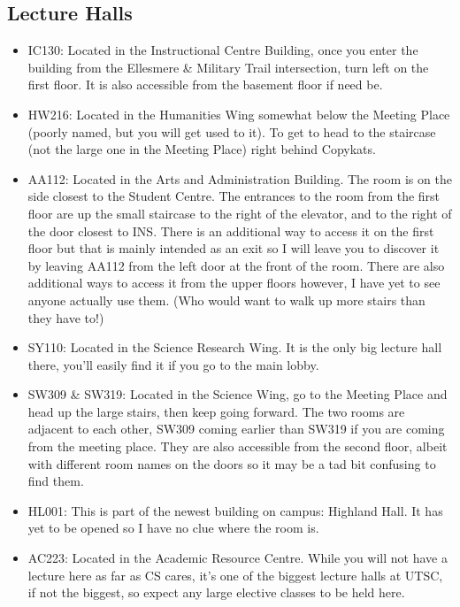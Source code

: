 \documentclass[11pt]{article}
\begin{document}
\subsection{Lecture Halls}
\begin{itemize}
\item IC130: Located in the Instructional Centre Building, once you enter the building from the Ellesmere \& Military Trail intersection, turn left on the first floor. It is also accessible from the basement floor if need be.
\item HW216: Located in the Humanities Wing somewhat below the Meeting Place (poorly named, but you will get used to it). To get to head to the staircase (not the large one in the Meeting Place) right behind Copykats.
\item AA112: Located in the Arts and Administration Building. The room is on the side closest to the Student Centre. The entrances to the room from the first floor are up the small staircase to the right of the elevator, and to the right of the door closest to INS. There is an additional way to access it on the first floor but that is mainly intended as an exit so I will leave you to discover it by leaving AA112 from the left door at the front of the room. There are also additional ways to access it from the upper floors however, I have yet to see anyone actually use them. (Who would want to walk up more stairs than they have to!)
\item SY110: Located in the Science Research Wing. It is the only big lecture hall there, you'll easily find it if you go to the main lobby.
\item SW309 \& SW319: Located in the Science Wing, go to the Meeting Place and head up the large stairs, then keep going forward. The two rooms are adjacent to each other, SW309 coming earlier than SW319 if you are coming from the meeting place. They are also accessible from the second floor, albeit with different room names on the doors so it may be a tad bit confusing to find them.
\item HL001: This is part of the newest building on campus: Highland Hall. It has yet to be opened so I have no clue where the room is.
\item AC223: Located in the Academic Resource Centre. While you will not have a lecture here as far as CS cares, it's one of the biggest lecture halls at UTSC, if not the biggest, so expect any large elective classes to be held here.
\end{itemize}
\end{document}

